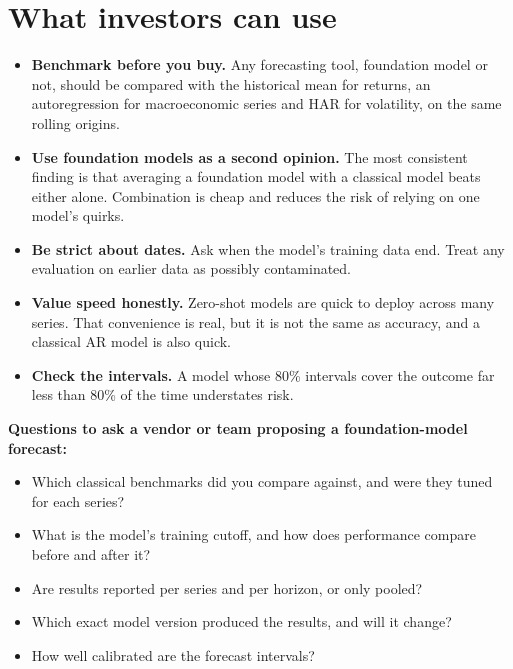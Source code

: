 \section{What investors can use}
\label{sec:22-investors}

\begin{itemize}
  \item \textbf{Benchmark before you buy.} Any forecasting tool, foundation model or not, should be compared with the historical mean for returns, an autoregression for macroeconomic series and HAR for volatility, on the same rolling origins.
  \item \textbf{Use foundation models as a second opinion.} The most consistent finding is that averaging a foundation model with a classical model beats either alone. Combination is cheap and reduces the risk of relying on one model's quirks.
  \item \textbf{Be strict about dates.} Ask when the model's training data end. Treat any evaluation on earlier data as possibly contaminated.
  \item \textbf{Value speed honestly.} Zero-shot models are quick to deploy across many series. That convenience is real, but it is not the same as accuracy, and a classical AR model is also quick.
  \item \textbf{Check the intervals.} A model whose 80\% intervals cover the outcome far less than 80\% of the time understates risk.
\end{itemize}

\textbf{Questions to ask a vendor or team proposing a foundation-model forecast:}

\begin{itemize}
  \item Which classical benchmarks did you compare against, and were they tuned for each series?
  \item What is the model's training cutoff, and how does performance compare before and after it?
  \item Are results reported per series and per horizon, or only pooled?
  \item Which exact model version produced the results, and will it change?
  \item How well calibrated are the forecast intervals?
\end{itemize}

